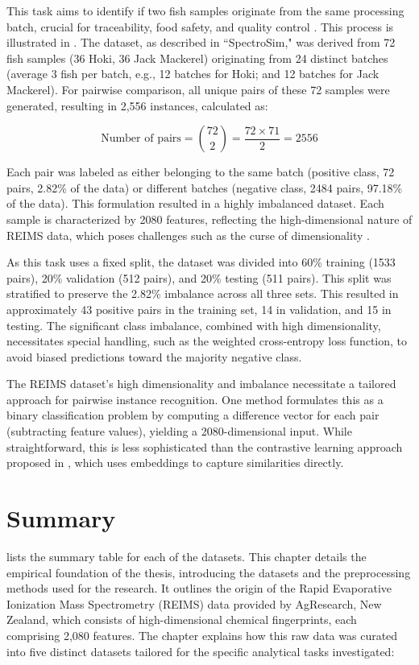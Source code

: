 This task aims to identify if two fish samples originate from the same processing batch, crucial for traceability, food safety, and quality control \citep{Mai2010,Thompson2005}. This process is illustrated in . The dataset, as described in ``SpectroSim," was derived from 72 fish samples (36 Hoki, 36 Jack Mackerel) originating from 24 distinct batches (average 3 fish per batch, e.g., 12 batches for Hoki; and 12 batches for Jack Mackerel). For pairwise comparison, all unique pairs of these 72 samples were generated, resulting in 2,556 instances, calculated as:

$$\text{Number of pairs} = \binom{72}{2} = \frac{72 \times 71}{2} = 2556$$

Each pair was labeled as either belonging to the same batch (positive class, 72 pairs, 2.82\% of the data) or different batches (negative class, 2484 pairs, 97.18\% of the data). This formulation resulted in a highly imbalanced dataset. Each sample is characterized by 2080 features, reflecting the high-dimensional nature of REIMS data, which poses challenges such as the curse of dimensionality \citep{Koppen2000}.

As this task uses a fixed split, the dataset was divided into 60\% training (1533 pairs), 20\% validation (512 pairs), and 20\% testing (511 pairs). This split was stratified to preserve the 2.82\% imbalance across all three sets. This resulted in approximately 43 positive pairs in the training set, 14 in validation, and 15 in testing. The significant class imbalance, combined with high dimensionality, necessitates special handling, such as the weighted cross-entropy loss function, to avoid biased predictions toward the majority negative class.

The REIMS dataset’s high dimensionality and imbalance necessitate a tailored approach for pairwise instance recognition. One method formulates this as a binary classification problem by computing a difference vector for each pair (subtracting feature values), yielding a 2080-dimensional input. While straightforward, this is less sophisticated than the contrastive learning approach proposed in , which uses embeddings to capture similarities directly.

\section{Summary}

 lists the summary table for each of the datasets. This chapter details the empirical foundation of the thesis, introducing the datasets and the preprocessing methods used for the research. It outlines the origin of the
Rapid Evaporative Ionization Mass Spectrometry (REIMS) data provided by AgResearch, New Zealand, which consists of high-dimensional chemical fingerprints, each comprising 2,080 features. The chapter explains how this raw data was curated into five distinct datasets tailored for the specific analytical tasks investigated:

